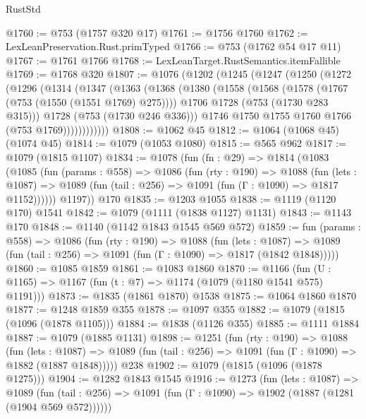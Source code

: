 \begin{lexlean}{RustStd}
\begin{coremodule}
@1760 := @753 (@1757 @320 @17)
@1761 := @1756 @1760
@1762 := LexLeanPreservation.Rust.primTyped
@1766 := @753 (@1762 @54 @17 @11)
@1767 := @1761 @1766
@1768 := LexLeanTarget.RustSemantics.itemFallible
@1769 := @1768 @320
@1807 := @1076
    (@1202
      (@1245
        (@1247
          (@1250
            (@1272
              (@1296
                (@1314
                  (@1347
                    (@1363
                      (@1368
                        (@1380
                          (@1558
                            (@1568
                              (@1578 (@1767 (@753 (@1550 (@1551 @1769) @275))))
                              @1706
                              @1728
                              (@753 (@1730 @283 @315)))
                            @1728
                            (@753 (@1730 @246 @336)))
                          @1746
                          @1750
                          @1755
                          @1760
                          @1766
                          (@753 @1769))))))))))))
@1808 := @1062 @45
@1812 := @1064 (@1068 @45) (@1074 @45)
@1814 := @1079 (@1053 @1080)
@1815 := @565 @962
@1817 := @1079 (@1815 @1107)
@1834 := @1078
    (fun (fn : @29) =>
    @1814
      (@1083
        (@1085
          (fun (params : @558) =>
          @1086
            (fun (rty : @190) =>
            @1088
              (fun (lets : @1087) =>
              @1089 (fun (tail : @256) => @1091 (fun (Γ : @1090) => @1817 @1152))))))
        @1197))
    @170
@1835 := @1203 @1055
@1838 := @1119 (@1120 @170) @1541
@1842 := @1079 (@1111 (@1838 @1127) @1131)
@1843 := @1143 @170
@1848 := @1140 (@1142 @1843 @1545 @569 @572)
@1859 := fun (params : @558) =>
  @1086
    (fun (rty : @190) =>
    @1088
      (fun (lets : @1087) =>
      @1089 (fun (tail : @256) => @1091 (fun (Γ : @1090) => @1817 (@1842 @1848)))))
@1860 := @1085 @1859
@1861 := @1083 @1860
@1870 := @1166 (fun (U : @1165) => @1167 (fun (t : @7) => @1174 (@1079 (@1180 @1541 @575) @1191)))
@1873 := @1835 (@1861 @1870) @1538
@1875 := @1064 @1860 @1870
@1877 := @1248 @1859 @355
@1878 := @1097 @355
@1882 := @1079 (@1815 (@1096 (@1878 @1105)))
@1884 := @1838 (@1126 @355)
@1885 := @1111 @1884
@1887 := @1079 (@1885 @1131)
@1898 := @1251
    (fun (rty : @190) =>
    @1088
      (fun (lets : @1087) =>
      @1089 (fun (tail : @256) => @1091 (fun (Γ : @1090) => @1882 (@1887 @1848)))))
    @238
@1902 := @1079 (@1815 (@1096 (@1878 @1275)))
@1904 := @1282 @1843 @1545
@1916 := @1273
    (fun (lets : @1087) =>
    @1089 (fun (tail : @256) => @1091 (fun (Γ : @1090) => @1902 (@1887 (@1281 (@1904 @569 @572))))))

\end{coremodule}
\end{lexlean}
